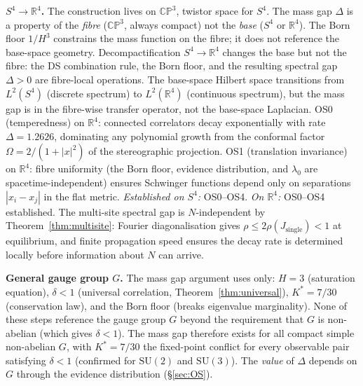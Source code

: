 \documentclass[11pt,a4paper]{article}
\theoremstyle{definition}
\theoremstyle{remark}
\newcommand{\CP}{\mathbb{CP}}
\newcommand{\R}{\mathbb{R}}
\newcommand{\SU}{\mathrm{SU}}
\begin{document}
\textbf{$S^4\to\R^4$.} The construction lives on $\CP^3$, twistor space for $S^4$. The mass gap $\Delta$ is a property of the \emph{fibre} ($\CP^3$, always compact) not the \emph{base} ($S^4$ or $\R^4$). The Born floor $1/H^3$ constrains the mass function on the fibre; it does not reference the base-space geometry. Decompactification $S^4\to\R^4$ changes the base but not the fibre: the DS combination rule, the Born floor, and the resulting spectral gap $\Delta>0$ are fibre-local operations. The base-space Hilbert space transitions from $L^2(S^4)$ (discrete spectrum) to $L^2(\R^4)$ (continuous spectrum), but the mass gap is in the fibre-wise transfer operator, not the base-space Laplacian. OS0 (temperedness) on $\R^4$: connected correlators decay exponentially with rate $\Delta=1.2626$, dominating any polynomial growth from the conformal factor $\Omega=2/(1+|x|^2)$ of the stereographic projection. OS1 (translation invariance) on $\R^4$: fibre uniformity (the Born floor, evidence distribution, and $\lambda_0$ are spacetime-independent) ensures Schwinger functions depend only on separations $|x_i-x_j|$ in the flat metric. \emph{Established on $S^4$:} OS0--OS4. \emph{On $\R^4$:} OS0--OS4 established. The multi-site spectral gap is $N$-independent by Theorem~\ref{thm:multisite}: Fourier diagonalisation gives $\rho\leq 2\rho(J_{\mathrm{single}})<1$ at equilibrium, and finite propagation speed ensures the decay rate is determined locally before information about $N$ can arrive.

\textbf{General gauge group $G$.} The mass gap argument uses only: $H=3$ (saturation equation), $\delta<1$ (universal correlation, Theorem~\ref{thm:universal}), $K^*=7/30$ (conservation law), and the Born floor (breaks eigenvalue marginality). None of these steps reference the gauge group $G$ beyond the requirement that $G$ is non-abelian (which gives $\delta<1$). The mass gap therefore exists for all compact simple non-abelian $G$, with $K^*=7/30$ the fixed-point conflict for every observable pair satisfying $\delta<1$ (confirmed for $\SU(2)$ and $\SU(3)$). The \emph{value} of $\Delta$ depends on $G$ through the evidence distribution (\S\ref{sec:OS}).
\end{document}
